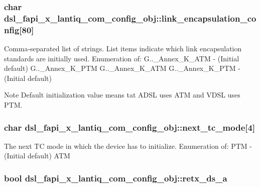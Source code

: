 \hypertarget{structdsl__fapi__x__lantiq__com__config__obj_a37e5159d62457661a69915c637c80c4d}{
\subsubsection[{link\-\_\-encapsulation\-\_\-config}]{\setlength{\rightskip}{0pt plus 5cm}char dsl\-\_\-fapi\-\_\-x\-\_\-lantiq\-\_\-com\-\_\-config\-\_\-obj\-::link\-\_\-encapsulation\-\_\-config\mbox{[}80\mbox{]}}}\label{structdsl__fapi__x__lantiq__com__config__obj_a37e5159d62457661a69915c637c80c4d}
Comma-\/separated list of strings. List items indicate which link encapsulation standards are initially used. Enumeration of\-: G..\-\_\-\-Annex\-\_\-\-K\-\_\-\-A\-T\-M -\/ (Initial default) G..\-\_\-\-Annex\-\_\-\-K\-\_\-\-P\-T\-M G..\-\_\-\-Annex\-\_\-\-K\-\_\-\-A\-T\-M G..\-\_\-\-Annex\-\_\-\-K\-\_\-\-P\-T\-M -\/ (Initial default) \begin{DoxyNote}{Note}
Default initialization value means tat A\-D\-S\-L uses A\-T\-M and V\-D\-S\-L uses P\-T\-M. 
\end{DoxyNote}
\hypertarget{structdsl__fapi__x__lantiq__com__config__obj_a2f64617e0041e9f1577472b327bd818e}{
\subsubsection[{next\-\_\-tc\-\_\-mode}]{\setlength{\rightskip}{0pt plus 5cm}char dsl\-\_\-fapi\-\_\-x\-\_\-lantiq\-\_\-com\-\_\-config\-\_\-obj\-::next\-\_\-tc\-\_\-mode\mbox{[}4\mbox{]}}}\label{structdsl__fapi__x__lantiq__com__config__obj_a2f64617e0041e9f1577472b327bd818e}
The next T\-C mode in which the device has to initialize. Enumeration of\-: P\-T\-M -\/ (Initial default) A\-T\-M \hypertarget{structdsl__fapi__x__lantiq__com__config__obj_af64c2d5f79e7b40504a38b1ba0550766}{
\subsubsection[{retx\-\_\-ds\-\_\-a}]{\setlength{\rightskip}{0pt plus 5cm}bool dsl\-\_\-fapi\-\_\-x\-\_\-lantiq\-\_\-com\-\_\-config\-\_\-obj\-::retx\-\_\-ds\-\_\-a}}\label{structdsl__fapi__x__lantiq__com__config__obj_af64c2d5f79e7b40504a38b1ba0550766}

